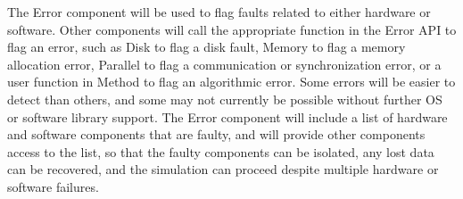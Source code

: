 \documentclass[11pt,letterpaper]{article}
\newcommand{\code}[1]{\textsf{#1}}
\begin{document}

The \code{Error} component will be used to flag faults related to
either hardware or software.  Other components will call the
appropriate function in the \code{Error} API to flag an error, such as
\code{Disk} to flag a disk fault, \code{Memory} to flag a memory
allocation error, \code{Parallel} to flag a communication or
synchronization error, or a user function in \code{Method} to flag an
algorithmic error.  Some errors will be easier to detect than others,
and some may not currently be possible without further OS or software
library support.  The \code{Error} component will include a list of
hardware and software components that are faulty, and will provide
other components access to the list, so that the faulty components can
be isolated, any lost data can be recovered, and the simulation can
proceed despite multiple hardware or software failures.

\end{document}
